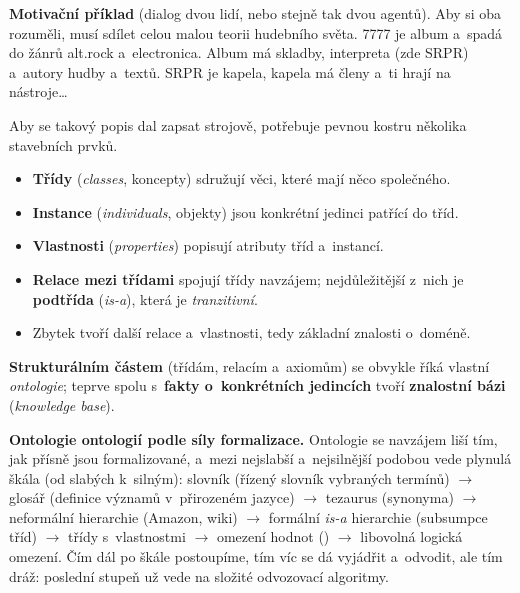 \documentclass[11pt,a4paper]{article}
\theoremstyle{definition}
\begin{document}
\textbf{Motivační příklad} (dialog dvou lidí, nebo stejně tak dvou agentů).  Aby si oba rozuměli, musí sdílet celou malou teorii hudebního světa.
7777 je album a~spadá do žánrů alt.rock a~electronica. Album má skladby, interpreta (zde SRPR)
a~autory hudby a~textů. SRPR je kapela, kapela má členy a~ti hrají na nástroje\dots

Aby se takový popis dal zapsat strojově, potřebuje pevnou kostru několika stavebních prvků.

\begin{defbox}
\begin{itemize}
\item \textbf{Třídy} (\emph{classes}, koncepty) sdružují věci, které mají něco společného.
\item \textbf{Instance} (\emph{individuals}, objekty) jsou konkrétní jedinci patřící do tříd.
\item \textbf{Vlastnosti} (\emph{properties}) popisují atributy tříd a~instancí.
\item \textbf{Relace mezi třídami} spojují třídy navzájem; nejdůležitější z~nich je
  \textbf{podtřída} (\emph{is-a}), která je \emph{tranzitivní}.
\item Zbytek tvoří další relace a~vlastnosti, tedy základní znalosti o~doméně.
\end{itemize}
\textbf{Strukturálním částem} (třídám, relacím a~axiomům) se obvykle říká vlastní
\emph{ontologie}; teprve spolu s~\textbf{fakty o~konkrétních jedincích} tvoří \textbf{znalostní bázi}
(\emph{knowledge base}).
\end{defbox}

\textbf{Ontologie ontologií podle síly formalizace.} Ontologie se navzájem liší tím, jak přísně
jsou formalizované, a~mezi nejslabší a~nejsilnější podobou vede plynulá škála
(od slabých k~silným):
slovník (řízený slovník vybraných termínů) $\to$ glosář (definice významů v~přirozeném jazyce)
$\to$ tezaurus (synonyma) $\to$ neformální hierarchie (Amazon, wiki) $\to$
formální \emph{is-a} hierarchie (subsumpce tříd) $\to$ třídy s~vlastnostmi $\to$
omezení hodnot () $\to$ libovolná logická omezení.
Čím dál po škále postoupíme, tím víc se dá vyjádřit a~odvodit, ale tím dráž: poslední stupeň
už vede na složité odvozovací algoritmy.
\end{document}

